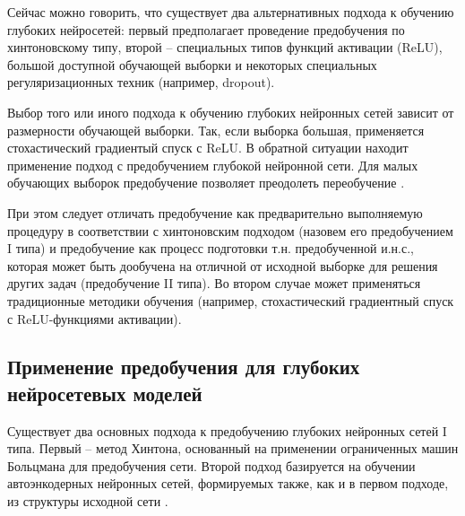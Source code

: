 Сейчас можно говорить, что существует два альтернативных подхода к обучению глубоких нейросетей: первый предполагает проведение предобучения по хинтоновскому типу, второй -- специальных типов функций активации (ReLU), большой доступной обучающей выборки и некоторых специальных регуляризационных техник (например, dropout).

Выбор того или иного подхода к обучению глубоких нейронных сетей зависит от размерности обучающей выборки. Так, если выборка большая, применяется стохастический градиентый спуск с ReLU. В обратной ситуации находит применение подход с предобучением глубокой нейронной сети. Для малых обучающих выборок предобучение позволяет преодолеть переобучение .

При этом следует отличать предобучение как предварительно выполняемую процедуру в соответствии с хинтоновским подходом (назовем его предобучением I типа) и предобучение как процесс подготовки т.н. предобученной и.н.с., которая может быть дообучена на отличной от исходной выборке для решения других задач (предобучение II типа). Во втором случае может применяться традиционные методики обучения (например, стохастический градиентный спуск с ReLU-функциями активации).

%
%
%

\subsection{Применение предобучения для глубоких нейросетевых моделей}

Существует два основных подхода к предобучению глубоких нейронных сетей I типа. Первый -- метод Хинтона, основанный на применении ограниченных машин Больцмана для предобучения сети. Второй подход базируется на обучении автоэнкодерных нейронных сетей, формируемых также, как и в первом подходе, из структуры исходной сети . 


